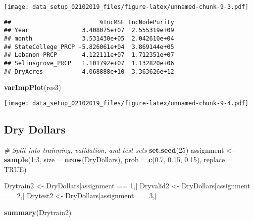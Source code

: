 \documentclass[]{article}
\newenvironment{Shaded}{\begin{snugshade}}{\end{snugshade}}
\newcommand{\KeywordTok}[1]{\textcolor[rgb]{0.13,0.29,0.53}{\textbf{{#1}}}}
\newcommand{\DataTypeTok}[1]{\textcolor[rgb]{0.13,0.29,0.53}{{#1}}}
\newcommand{\DecValTok}[1]{\textcolor[rgb]{0.00,0.00,0.81}{{#1}}}
\newcommand{\FloatTok}[1]{\textcolor[rgb]{0.00,0.00,0.81}{{#1}}}
\newcommand{\StringTok}[1]{\textcolor[rgb]{0.31,0.60,0.02}{{#1}}}
\newcommand{\CommentTok}[1]{\textcolor[rgb]{0.56,0.35,0.01}{\textit{{#1}}}}
\newcommand{\OtherTok}[1]{\textcolor[rgb]{0.56,0.35,0.01}{{#1}}}
\newcommand{\NormalTok}[1]{{#1}}
\begin{document}
\texttt{[image: data\_setup\_02102019\_files/figure-latex/unnamed-chunk-9-3.pdf]}

\begin{Shaded}
\end{Shaded}

\begin{verbatim}
##                         %IncMSE IncNodePurity
## Year               3.408075e+07  2.555319e+09
## month              3.531430e+05  2.042610e+04
## StateCollege_PRCP -5.826061e+04  3.869144e+05
## Lebanon_PRCP       4.122111e+07  1.712351e+07
## Selinsgrove_PRCP   1.101792e+07  1.132820e+06
## DryAcres           4.068888e+10  3.363626e+12
\end{verbatim}

\begin{Shaded}
\begin{Highlighting}[]
\KeywordTok{varImpPlot}\NormalTok{(res3)                      }
\end{Highlighting}
\end{Shaded}

\texttt{[image: data\_setup\_02102019\_files/figure-latex/unnamed-chunk-9-4.pdf]}

\subsection{Dry Dollars}\label{dry-dollars}

\begin{Shaded}
\begin{Highlighting}[]
\CommentTok{# Split into trainning, validation, and test sets}
\KeywordTok{set.seed}\NormalTok{(}\DecValTok{25}\NormalTok{)}
\NormalTok{assignment <-}\StringTok{ }\KeywordTok{sample}\NormalTok{(}\DecValTok{1}\NormalTok{:}\DecValTok{3}\NormalTok{, }\DataTypeTok{size =} \KeywordTok{nrow}\NormalTok{(DryDollars), }\DataTypeTok{prob =} \KeywordTok{c}\NormalTok{(}\FloatTok{0.7}\NormalTok{, }\FloatTok{0.15}\NormalTok{, }\FloatTok{0.15}\NormalTok{), }\DataTypeTok{replace =} \OtherTok{TRUE}\NormalTok{)}

\NormalTok{Drytrain2 <-}\StringTok{ }\NormalTok{DryDollars[assignment ==}\StringTok{ }\DecValTok{1}\NormalTok{,]}
\NormalTok{Dryvalid2 <-}\StringTok{ }\NormalTok{DryDollars[assignment ==}\StringTok{ }\DecValTok{2}\NormalTok{,]}
\NormalTok{Drytest2 <-}\StringTok{ }\NormalTok{DryDollars[assignment ==}\StringTok{ }\DecValTok{3}\NormalTok{,]}

\KeywordTok{summary}\NormalTok{(Drytrain2)}
\end{Highlighting}
\end{Shaded}
\end{document}
